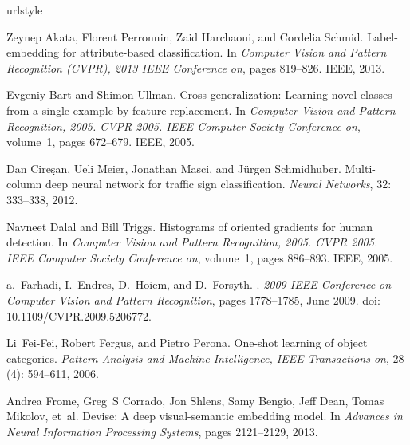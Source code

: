\documentclass{bmvc2k}
\begin{document}
%
\begin{thebibliography}{23}
\providecommand{\natexlab}[1]{#1}
\providecommand{\url}[1]{\texttt{#1}}
\expandafter\ifx\csname urlstyle\endcsname\relax
  \providecommand{\doi}[1]{doi: #1}\else
  \providecommand{\doi}{doi: \begingroup \urlstyle{rm}\Url}\fi

Zeynep Akata, Florent Perronnin, Zaid Harchaoui, and Cordelia Schmid.
\newblock Label-embedding for attribute-based classification.
\newblock In \emph{Computer Vision and Pattern Recognition (CVPR), 2013 IEEE
  Conference on}, pages 819--826. IEEE, 2013.

Evgeniy Bart and Shimon Ullman.
\newblock Cross-generalization: Learning novel classes from a single example by
  feature replacement.
\newblock In \emph{Computer Vision and Pattern Recognition, 2005. CVPR 2005.
  IEEE Computer Society Conference on}, volume~1, pages 672--679. IEEE, 2005.

Dan Cire{\c{s}}an, Ueli Meier, Jonathan Masci, and J{\"u}rgen Schmidhuber.
\newblock Multi-column deep neural network for traffic sign classification.
\newblock \emph{Neural Networks}, 32: 333--338, 2012.

Navneet Dalal and Bill Triggs.
\newblock Histograms of oriented gradients for human detection.
\newblock In \emph{Computer Vision and Pattern Recognition, 2005. CVPR 2005.
  IEEE Computer Society Conference on}, volume~1, pages 886--893. IEEE, 2005.

a.~Farhadi, I.~Endres, D.~Hoiem, and D.~Forsyth.
.
\newblock \emph{2009 IEEE Conference on Computer Vision and Pattern
  Recognition}, pages 1778--1785, June 2009.
\newblock \doi{10.1109/CVPR.2009.5206772}.

Li~Fei-Fei, Robert Fergus, and Pietro Perona.
\newblock One-shot learning of object categories.
\newblock \emph{Pattern Analysis and Machine Intelligence, IEEE Transactions
  on}, 28 (4): 594--611, 2006.

Andrea Frome, Greg~S Corrado, Jon Shlens, Samy Bengio, Jeff Dean, Tomas
  Mikolov, et~al.
\newblock Devise: A deep visual-semantic embedding model.
\newblock In \emph{Advances in Neural Information Processing Systems}, pages
  2121--2129, 2013.


\end{thebibliography}
\end{document}

